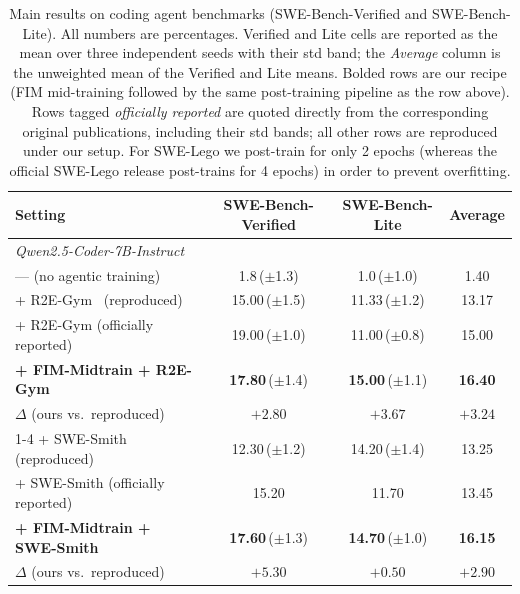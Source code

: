 \begin{table}[t]
\centering
\caption{Main results on coding agent benchmarks (SWE-Bench-Verified and
SWE-Bench-Lite). All numbers are percentages. Verified and Lite cells
are reported as the mean over three independent seeds with their std
band; the \emph{Average} column is the unweighted mean of the Verified
and Lite means. Bolded rows are our recipe (FIM
mid-training followed by the same post-training pipeline as the row
above). Rows tagged \emph{officially reported} are quoted directly from
the corresponding original publications, including their std bands; all
other rows are reproduced under our setup. For SWE-Lego we post-train
for only 2 epochs (whereas the official SWE-Lego release post-trains
for 4 epochs) in order to prevent overfitting.}
\label{tab:main}
\setlength{\tabcolsep}{6pt}
\begin{tabular}{lccc}
\toprule
Setting & SWE-Bench-Verified & SWE-Bench-Lite & Average \\
\midrule
\multicolumn{4}{l}{\textit{Qwen2.5-Coder-7B-Instruct}} \\
\quad --- (no agentic training)                       & 1.8\,($\pm$1.3)            & 1.0\,($\pm$1.0)            & 1.40 \\
\quad + R2E-Gym~\citep{r2egym} (reproduced)           & 15.00\,($\pm$1.5)          & 11.33\,($\pm$1.2)          & 13.17 \\
\quad + R2E-Gym (officially reported)                 & 19.00\,($\pm$1.0)          & 11.00\,($\pm$0.8)          & 15.00 \\
\quad \textbf{+ FIM-Midtrain + R2E-Gym}               & \textbf{17.80}\,($\pm$1.4) & \textbf{15.00}\,($\pm$1.1) & \textbf{16.40} \\
\rowcolor{blue!8}
\quad\quad $\Delta$ (ours vs.\ reproduced)            & $+2.80$                    & $+3.67$                    & $+3.24$ \\
\cmidrule(lr){1-4}
\quad + SWE-Smith~\citep{swesmith} (reproduced)       & 12.30\,($\pm$1.2)          & 14.20\,($\pm$1.4)          & 13.25 \\
\quad + SWE-Smith (officially reported)               & 15.20                       & 11.70                       & 13.45 \\
\quad \textbf{+ FIM-Midtrain + SWE-Smith}             & \textbf{17.60}\,($\pm$1.3) & \textbf{14.70}\,($\pm$1.0) & \textbf{16.15} \\
\rowcolor{blue!8}
\quad\quad $\Delta$ (ours vs.\ reproduced)            & $+5.30$                    & $+0.50$                    & $+2.90$ \\

\end{tabular}
\end{table}
